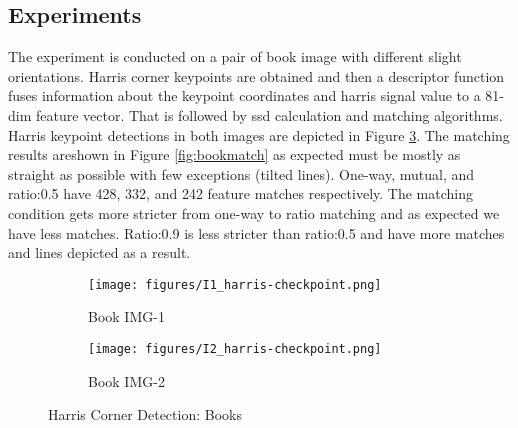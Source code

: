 \documentclass{article}
\begin{document}
\subsection{Experiments}

\begin{center}
    \raggedright

    The experiment is conducted on a pair of book image with different slight orientations. Harris corner keypoints are obtained and then a descriptor function fuses information about the keypoint coordinates and harris signal value to a 81-dim feature vector. That is followed by ssd calculation and matching algorithms. Harris keypoint detections in both images are depicted in Figure \ref{fig:harsigbooks}. The matching results areshown in Figure \ref{fig:bookmatch} as expected must be mostly as straight as possible with few exceptions (tilted lines). One-way, mutual, and ratio:0.5 have 428, 332, and 242 feature matches respectively. The matching condition gets more stricter from one-way to ratio matching and as expected we have less matches. Ratio:0.9 is less stricter than ratio:0.5 and have more matches and lines depicted as a result.
    
\end{center}



\begin{figure}[H]
     \centering
     \begin{subfigure}[b]{0.4\textwidth}
         \centering
         \texttt{[image: figures/I1\_harris-checkpoint.png]}
         \caption{Book IMG-1}
         \label{fig:book1}
     \end{subfigure}
     \begin{subfigure}[b]{0.4\textwidth}
         \centering
         \texttt{[image: figures/I2\_harris-checkpoint.png]}
         \caption{Book IMG-2}
         \label{fig:book2}
     \end{subfigure}
     
        \caption{Harris Corner Detection: Books}
        \label{fig:harsigbooks}
\end{figure}
\end{document}
